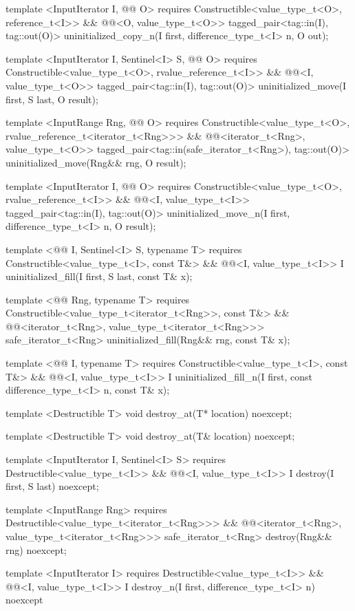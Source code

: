 {\begin{codeblock}
template <InputIterator I, @@ O>
requires
  Constructible<value_type_t<O>, reference_t<I>> &&
  @@<O, value_type_t<O>>
tagged_pair<tag::in(I), tag::out(O)> uninitialized_copy_n(I first, difference_type_t<I> n, O out);

template <InputIterator I, Sentinel<I> S, @@ O>
requires
  Constructible<value_type_t<O>, rvalue_reference_t<I>> &&
  @@<I, value_type_t<O>>
tagged_pair<tag::in(I), tag::out(O)> uninitialized_move(I first, S last, O result);

template <InputRange Rng, @@ O>
requires
  Constructible<value_type_t<O>, rvalue_reference_t<iterator_t<Rng>>> &&
  @@<iterator_t<Rng>, value_type_t<O>>
tagged_pair<tag::in(safe_iterator_t<Rng>), tag::out(O)> uninitialized_move(Rng&& rng, O result);

template <InputIterator I, @@ O>
requires
  Constructible<value_type_t<O>, rvalue_reference_t<I>> &&
  @@<I, value_type_t<I>>
tagged_pair<tag::in(I), tag::out(O)> uninitialized_move_n(I first, difference_type_t<I> n, O result);

template <@@ I, Sentinel<I> S, typename T>
requires
  Constructible<value_type_t<I>, const T&> &&
  @@<I, value_type_t<I>>
I uninitialized_fill(I first, S last, const T& x);

template <@@ Rng, typename T>
requires
  Constructible<value_type_t<iterator_t<Rng>>, const T&> &&
  @@<iterator_t<Rng>, value_type_t<iterator_t<Rng>>>
safe_iterator_t<Rng> uninitialized_fill(Rng&& rng, const T& x);

template <@@ I, typename T>
requires
  Constructible<value_type_t<I>, const T&> &&
  @@<I, value_type_t<I>>
I uninitialized_fill_n(I first, const difference_type_t<I> n, const T& x);

template <Destructible T>
void destroy_at(T* location) noexcept;

template <Destructible T>
void destroy_at(T& location) noexcept;

template <InputIterator I, Sentinel<I> S>
requires
  Destructible<value_type_t<I>> &&
  @@<I, value_type_t<I>>
I destroy(I first, S last) noexcept;

template <InputRange Rng>
requires
  Destructible<value_type_t<iterator_t<Rng>>> &&
  @@<iterator_t<Rng>, value_type_t<iterator_t<Rng>>>
safe_iterator_t<Rng> destroy(Rng&& rng) noexcept;

template <InputIterator I>
requires
  Destructible<value_type_t<I>> &&
  @@<I, value_type_t<I>>
I destroy_n(I first, difference_type_t<I> n) noexcept
\end{codeblock}
} %


